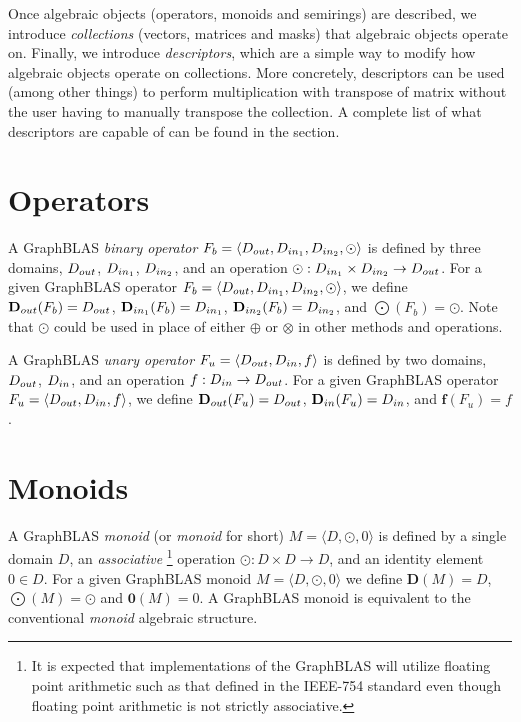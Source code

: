 Once algebraic objects (operators, monoids and semirings) are described,
we introduce \emph{collections} (vectors, matrices and masks) that
algebraic objects operate on. Finally, we introduce \emph{descriptors},
which are a simple way to modify how algebraic objects operate on
collections. More concretely, descriptors can be used (among other
things) to perform multiplication with transpose of matrix without the
user having to manually transpose the collection. A complete list of
what descriptors are capable of can be found in the section.

\section{Operators}

A GraphBLAS \emph{binary operator} $F_b = \langle \mbox{$D_{out}$}, \mbox{$D_{in_{1}}$}, \mbox{$D_{in_{2}}$}, 
\odot \rangle$
is defined by three domains, $\mbox{$D_{out}$}$, $\mbox{$D_{in_{1}}$}$, $\mbox{$D_{in_{2}}$}$, and an operation
$\odot: \mbox{$D_{in_{1}}$} \times \mbox{$D_{in_{2}}$} \rightarrow \mbox{$D_{out}$}$.  For a given GraphBLAS operator
$F_b=\langle \mbox{$D_{out}$}, \mbox{$D_{in_{1}}$}, \mbox{$D_{in_{2}}$}, \odot \rangle$, we define $\mbox{$\mathbf{D}_{out}$}(F_b) = \mbox{$D_{out}$}$,
$\mbox{$\mathbf{D}_{in_{1}}$}(F_b) = \mbox{$D_{in_{1}}$}$, $\mbox{$\mathbf{D}_{in_{2}}$}(F_b) = \mbox{$D_{in_{2}}$}$, and $\mathbf{\bigodot}(F_b)
= \odot$.  Note that $\odot$ could be used in place of either $\oplus$ or 
$\otimes$ in other methods and operations.

A GraphBLAS \emph{unary operator} $F_u = \langle \mbox{$D_{out}$}, \mbox{$D_{in}$}, f\rangle$
is defined by two domains, $\mbox{$D_{out}$}$, $\mbox{$D_{in}$}$, and an operation
$f: \mbox{$D_{in}$} \rightarrow \mbox{$D_{out}$}$.  For a given GraphBLAS operator
$F_u=\langle \mbox{$D_{out}$}, \mbox{$D_{in}$}, f \rangle$, we define $\mbox{$\mathbf{D}_{out}$}(F_u) = \mbox{$D_{out}$}$, 
$\mbox{$\mathbf{D}_{in}$}(F_u) = \mbox{$D_{in}$}$, and $\mathbf{f}(F_u) = f$.

\section{Monoids}

A GraphBLAS \emph{monoid} (or \emph{monoid} for short) $M =
\langle D,\odot,0 \rangle$ is defined by a single domain $D$, an 
\emph{associative}
\footnote{\label{Foot:associative}It is expected 
that implementations of the GraphBLAS will utilize floating point arithmetic 
such as that defined in the IEEE-754 standard even though
floating point arithmetic is not strictly associative.} 
operation $\odot: D \times D \rightarrow D$,
and an identity element $0 \in D$.  For a given GraphBLAS monoid $M=\langle
D,\odot,0 \rangle$ we define $\mathbf{D}(M) = D$, $\mathbf{\bigodot}(M) =
\odot$ and $\mathbf{0}(M) = 0$.  A GraphBLAS monoid is equivalent to 
the conventional \emph{monoid} algebraic structure.

